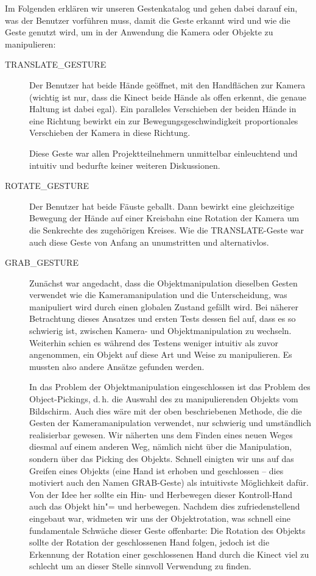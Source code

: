 	Im Folgenden erklären wir unseren Gestenkatalog und gehen dabei darauf ein, was der Benutzer vorführen muss, damit die Geste erkannt wird und wie die Geste genutzt wird, um in der Anwendung die Kamera oder Objekte zu manipulieren:
	\begin{description}
		\item[TRANSLATE\_GESTURE]
		Der Benutzer hat beide Hände geöffnet, mit den Handflächen zur Kamera (wichtig ist nur, dass die Kinect beide Hände als offen erkennt, die genaue Haltung ist dabei egal). Ein paralleles Verschieben der beiden Hände in eine Richtung bewirkt ein zur Bewegungsgeschwindigkeit proportionales Verschieben der Kamera in diese Richtung.\par 
		Diese Geste war allen Projektteilnehmern unmittelbar einleuchtend und intuitiv und bedurfte keiner weiteren Diskussionen.
		\item[ROTATE\_GESTURE] Der Benutzer hat beide Fäuste geballt. Dann bewirkt eine gleichzeitige Bewegung der Hände auf einer Kreisbahn eine Rotation der Kamera um die Senkrechte des zugehörigen Kreises.
		Wie die TRANSLATE-Geste war auch diese Geste von Anfang an unumstritten und alternativlos.
		\item[GRAB\_GESTURE] Zunächst war angedacht, dass die Objektmanipulation dieselben Gesten verwendet wie die Kameramanipulation und die Unterscheidung, was manipuliert wird durch einen globalen Zustand gefällt wird. Bei näherer Betrachtung dieses Ansatzes und ersten Tests dessen fiel auf, dass es so schwierig ist, zwischen Kamera- und Objektmanipulation zu wechseln. Weiterhin schien es während des Testens weniger intuitiv als zuvor angenommen, ein Objekt auf diese Art und Weise zu manipulieren. Es mussten also andere Ansätze gefunden werden.\par 
		In das Problem der Objektmanipulation eingeschlossen ist das Problem des Object-Pickings, d.\,h. die Auswahl des zu manipulierenden Objekts vom Bildschirm. Auch dies wäre mit der oben beschriebenen Methode, die die Gesten der Kameramanipulation verwendet, nur schwierig und umständlich realisierbar gewesen. Wir näherten uns dem Finden eines neuen Weges diesmal auf einem anderen Weg, nämlich nicht über die Manipulation, sondern über das Picking des Objekts. Schnell einigten wir uns auf das Greifen eines Objekts (eine Hand ist erhoben und geschlossen -- dies motiviert auch den Namen \glqq GRAB\grqq-Geste) als intuitivste Möglichkeit dafür. Von der Idee her sollte ein Hin- und Herbewegen dieser \glqq Kontroll-Hand\grqq{} auch das Objekt hin"= und herbewegen. Nachdem dies zufriedenstellend eingebaut war, widmeten wir uns der Objektrotation, was schnell eine fundamentale Schwäche dieser Geste offenbarte: Die Rotation des Objekts sollte der Rotation der geschlossenen Hand folgen, jedoch ist die Erkennung der Rotation einer geschlossenen Hand durch die Kinect viel zu schlecht um an dieser Stelle sinnvoll Verwendung zu finden.\par 

\end{description}
